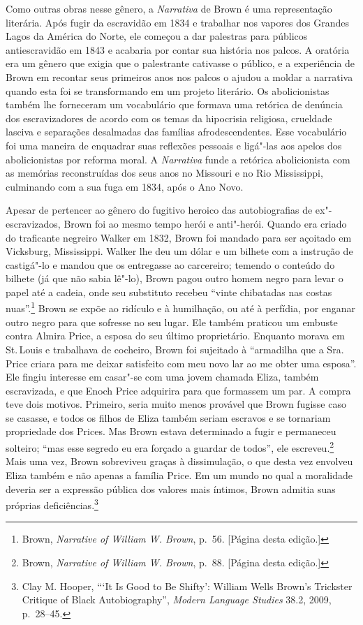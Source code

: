 Como outras obras nesse gênero, a \emph{Narrativa} de Brown é uma
representação literária. Após fugir da escravidão em 1834 e trabalhar
nos vapores dos Grandes Lagos da América do Norte, ele começou a dar
palestras para públicos antiescravidão em 1843 e acabaria por contar sua
história nos palcos. A oratória era um gênero que exigia que o
palestrante cativasse o público, e a experiência de Brown em recontar
seus primeiros anos nos palcos o ajudou a moldar a narrativa quando esta
foi se transformando em um projeto literário. Os abolicionistas também
lhe forneceram um vocabulário que formava uma retórica de denúncia dos
escravizadores de acordo com os temas da hipocrisia religiosa, crueldade
lasciva e separações desalmadas das famílias afrodescendentes. Esse
vocabulário foi uma maneira de enquadrar suas reflexões pessoais e
ligá"-las aos apelos dos abolicionistas por reforma moral. A
\emph{Narrativa} funde a retórica abolicionista com as memórias
reconstruídas dos seus anos no Missouri e no Rio Mississippi, culminando
com a sua fuga em 1834, após o Ano Novo.

Apesar de pertencer ao gênero do fugitivo heroico das autobiografias de
ex"-escravizados, Brown foi ao mesmo tempo herói e anti"-herói. Quando era
criado do traficante negreiro Walker em 1832, Brown foi mandado para
ser açoitado em Vicksburg, Mississippi. Walker lhe deu um dólar e um
bilhete com a instrução de castigá"-lo e mandou que os entregasse ao
carcereiro; temendo o conteúdo do bilhete (já que não sabia lê"-lo),
Brown pagou outro homem negro para levar o papel até a cadeia, onde seu
substituto recebeu ``vinte chibatadas nas costas
nuas''.\footnote{Brown, \emph{Narrative of William W. Brown}, p.~56.
  {[}Página \pageref{ref2} desta edição.{]}} Brown se expõe ao ridículo e à
humilhação, ou até à perfídia, por enganar outro negro para que sofresse
no seu lugar. Ele também praticou um embuste contra Almira Price, a
esposa do seu último proprietário. Enquanto morava em St.\,Louis e
trabalhava de cocheiro, Brown foi sujeitado à ``armadilha que a Sra.\,Price criara para me deixar satisfeito com meu novo lar ao me obter uma
esposa''. Ele fingiu interesse em casar"-se com uma jovem chamada Eliza,
também escravizada, e que Enoch Price adquirira para que formassem um
par. A compra teve dois motivos. Primeiro, seria muito menos provável
que Brown fugisse caso se casasse, e todos os filhos de Eliza também
seriam escravos e se tornariam propriedade dos Prices. Mas Brown
estava determinado a fugir e permaneceu solteiro; ``mas esse segredo eu
era forçado a guardar de todos'', ele escreveu.\footnote{Brown,
  \emph{Narrative of William W. Brown}, p.~88. {[}Página \pageref{ref3} desta
  edição.{]}} Mais uma vez, Brown sobreviveu graças à dissimulação, o
que desta vez envolveu Eliza também e não apenas a família Price. Em um
mundo no qual a moralidade deveria ser a expressão pública dos valores
mais íntimos, Brown admitia suas próprias deficiências.\footnote{Clay M.
  Hooper, ```It Is Good to Be Shifty': William Wells Brown's Trickster
  Critique of Black Autobiography'', \emph{Modern Language Studies} 38.2,
  2009, p.~28--45.}

